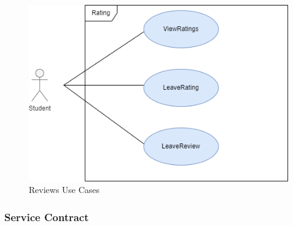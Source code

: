 \documentclass[hidelinks, 12pt, a4paper]{article}
\begin{document}
                    \begin{figure}[H]
                    
                        \centering
                        \includegraphics[]{images/Rating Usecase.drawio.png}
                        \caption{Reviews Use Cases}
                        \label{fig:User UseCases}
                        
                    \end{figure}
         \newpage           
                \subsubsection{Service Contract}
            
\end{document}
